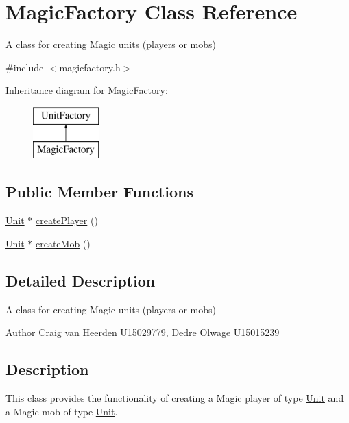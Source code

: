 \hypertarget{class_magic_factory}{\section{\-Magic\-Factory \-Class \-Reference}
\label{class_magic_factory}
}


\-A class for creating \-Magic units (players or mobs)  




{\ttfamily \#include $<$magicfactory.\-h$>$}

\-Inheritance diagram for \-Magic\-Factory\-:\begin{figure}[H]
\begin{center}
\leavevmode
\includegraphics[height=2.000000cm]{class_magic_factory}
\end{center}
\end{figure}
\subsection*{\-Public \-Member \-Functions}
\begin{DoxyCompactItemize}
\item 
\hyperlink{class_unit}{\-Unit} $\ast$ \hyperlink{class_magic_factory_a3021b979bd991e32e311c8869d500b46}{create\-Player} ()
\item 
\hyperlink{class_unit}{\-Unit} $\ast$ \hyperlink{class_magic_factory_a9cfbadc11ba1c80d8a8c43d060e24ca6}{create\-Mob} ()
\end{DoxyCompactItemize}


\subsection{\-Detailed \-Description}
\-A class for creating \-Magic units (players or mobs) 

\begin{DoxyAuthor}{\-Author}
\-Craig van \-Heerden \-U15029779, \-Dedre \-Olwage \-U15015239
\end{DoxyAuthor}
\hypertarget{class_unit_factory_Description}{}\subsection{\-Description}\label{class_unit_factory_Description}
\-This class provides the functionality of creating a \-Magic player of type \hyperlink{class_unit}{\-Unit} and a \-Magic mob of type \hyperlink{class_unit}{\-Unit}. 

